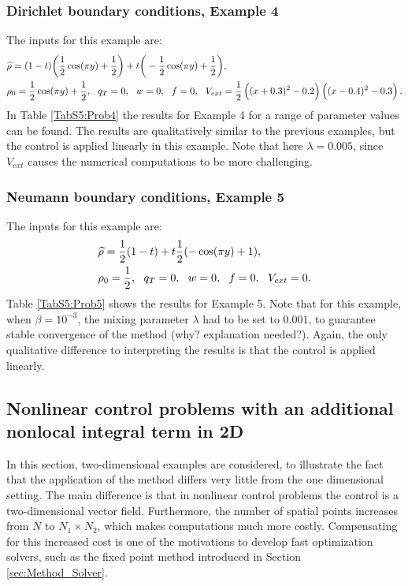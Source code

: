 \subsubsection{Dirichlet boundary conditions, Example 4}
The inputs for this example are:
\begin{align*}
&\widehat \rho = (1 - t)\bigg(\frac{1}{2}\cos(\pi y) + \frac{1}{2}\bigg)  + t\bigg(-\frac{1}{2}\cos(\pi y) + \frac{1}{2}\bigg),\\
&\rho_{0} = \frac{1}{2}\cos(\pi y) + \frac{1}{2},\ \
q_{T} = 0,\ \
{w} = 0,\ \
f =0, \ \
V_{ext} =\frac{1}{2}\left((x + 0.3)^2 - 0.2\right)\left((x-0.4)^2 - 0.3\right).
\end{align*}
In Table \ref{TabS5:Prob4} the results for Example 4 for a range of parameter values can be found. The results are qualitatively similar to the previous examples, but the control is applied linearly in this example. Note that here $\lambda = 0.005$, since $V_{{ext}}$ causes the numerical computations to be more challenging.




\subsubsection{Neumann boundary conditions, Example 5}
The inputs for this example are:
\begin{align*}
&\widehat \rho = \frac{1}{2}(1-t) + t\frac{1}{2}(-\cos(\pi y) + 1),\\
&\rho_{0} = \frac{1}{2},\ \
q_{T} = 0,\ \
{w} = 0,\ \
f =0,\ \
V_{ext} =0.
\end{align*}
Table \ref{TabS5:Prob5} shows the results for Example 5. Note that for this example, when $\beta = 10^{-3}$, the mixing parameter $\lambda$ had to be set to $0.001$, to guarantee stable convergence of the method (why? explanation needed?).
Again, the only qualitative difference to interpreting the results is that the control is applied linearly.


\subsection{Nonlinear control problems with an additional nonlocal integral term in 2D}
In this section, two-dimensional examples are considered, to illustrate the fact that the application of the method differs very little from the one dimensional setting. The main difference is that in nonlinear control problems the control is a two-dimensional vector field. Furthermore, the number of spatial points increases from $N$ to $N_1\times N_2$, which makes computations much more costly. Compensating for this increased cost is one of the motivations to develop fast optimization solvers, such as the fixed point method introduced in Section \ref{sec:Method_Solver}.
